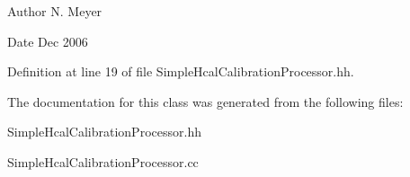 \begin{DoxyAuthor}{Author}
N. Meyer 
\end{DoxyAuthor}
\begin{DoxyDate}{Date}
Dec 2006 
\end{DoxyDate}


Definition at line 19 of file Simple\-Hcal\-Calibration\-Processor.\-hh.



The documentation for this class was generated from the following files\-:\begin{DoxyCompactItemize}
\item 
Simple\-Hcal\-Calibration\-Processor.\-hh\item 
Simple\-Hcal\-Calibration\-Processor.\-cc\end{DoxyCompactItemize}
